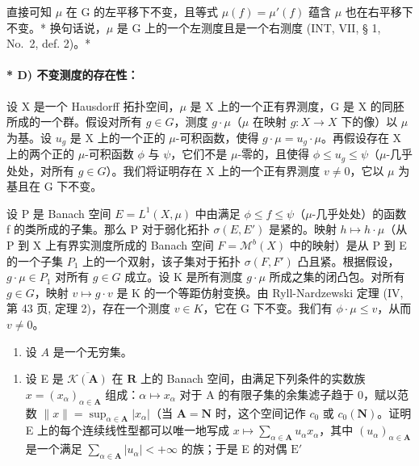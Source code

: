 直接可知 \(\mu\) 在 G 的左平移下不变，且等式 \(\mu(f) = \mu'(f)\) 蕴含 \(\mu\) 也在右平移下不变。* 换句话说，\(\mu\) 是 G 上的一个左测度且是一个右测度 (INT, VII, § 1, No.~2, def. 2)。*

\paragraph{* D) 不变测度的存在性：}

设 X 是一个 Hausdorff 拓扑空间，\(\mu\) 是 X 上的一个正有界测度，G 是 X 的同胚所成的一个群。假设对所有 \(g \in G\)，测度 \(g \cdot \mu\)（\(\mu\) 在映射 \(g : X \to X\) 下的像）以 \(\mu\) 为基。设 \(u_g\) 是 X 上的一个正的 \(\mu\)-可积函数，使得 \(g \cdot \mu = u_g \cdot \mu\)。再假设存在 X 上的两个正的 \(\mu\)-可积函数 \(\phi\) 与 \(\psi\)，它们不是 \(\mu\)-零的，且使得 \(\phi \leqslant u_g \leqslant \psi\)（\(\mu\)-几乎处处，对所有 \(g \in G\)）。我们将证明存在 X 上的一个正有界测度 \(v \neq 0\)，它以 \(\mu\) 为基且在 G 下不变。

设 P 是 Banach 空间 \(E = L^{1}(X, \mu)\) 中由满足 \(\phi \leqslant f \leqslant \psi\)（\(\mu\)-几乎处处）的函数 f 的类所成的子集。那么 P 对于弱化拓扑 \(\sigma(E, E')\) 是紧的。映射 \(h \mapsto h \cdot \mu\)（从 P 到 X 上有界实测度所成的 Banach 空间 \(F = \mathcal{M}^{b}(X)\) 中的映射）是从 P 到 E 的一个子集 \(P_{1}\) 上的一个双射，该子集对于拓扑 \(\sigma(F, F')\) 凸且紧。根据假设，\(g \cdot \mu \in P_{1}\) 对所有 \(g \in G\) 成立。设 K 是所有测度 \(g \cdot \mu\) 所成之集的闭凸包。对所有 \(g \in G\)，映射 \(v \mapsto g \cdot v\) 是 K 的一个等距仿射变换。由 Ryll-Nardzewski 定理 (IV, 第 43 页, 定理 2)，存在一个测度 \(v \in K\)，它在 G 下不变。我们有 \(\phi \cdot \mu \leqslant v\)，从而 \(v \neq 0\)。

\closechapterappendix
\exercisesheading

\exercisegroup

\begin{enumerate}
\def\labelenumi{\arabic{enumi})}
\tightlist
\item
  设 \(A\) 是一个无穷集。
\end{enumerate}

\begin{enumerate}
\def\labelenumi{\alph{enumi})}
\tightlist
\item
  设 E 是 \(\overline{\mathcal{K}(\mathbf{A})}\) 在 \(\mathbf{R}\) 上的 Banach 空间，由满足下列条件的实数族 \(x = (x_{\alpha})_{\alpha \in \mathbf{A}}\) 组成：\(\alpha \mapsto x_{\alpha}\) 对于 A 的有限子集的余集滤子趋于 0，赋以范数 \(\| x\| = \sup_{\alpha \in \mathbf{A}}|x_{\alpha}|\)（当 \(\mathbf{A} = \mathbf{N}\) 时，这个空间记作 \(c_0\) 或 \(c_0(\mathbf{N})\)。证明 E 上的每个连续线性型都可以唯一地写成 \(x \mapsto \sum_{\alpha \in \mathbf{A}} u_{\alpha} x_{\alpha}\)，其中 \((u_{\alpha})_{\alpha \in \mathbf{A}}\) 是一个满足 \(\sum_{\alpha \in \mathbf{A}} |u_{\alpha}| < +\infty\) 的族；于是 E 的对偶 \(\mathrm{E}'\)
\end{enumerate}

